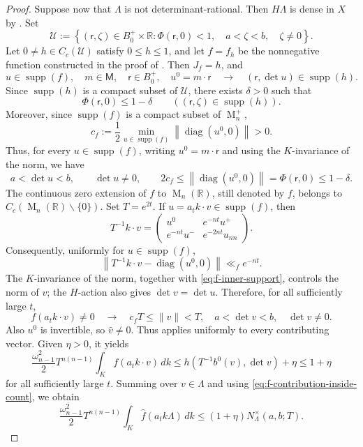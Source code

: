 \documentclass[reqno,11pt]{amsart}
\numberwithin{equation}{section}
\theoremstyle{definition}
\theoremstyle{remark}
\newcommand{\op}{\operatorname}
\newcommand{\M}{\op{M}}
\begin{document}
\begin{proof}
Suppose now that $\Lambda$ is not determinant-rational. Then
$H\Lambda$ is dense in $X$ by
. Set
$$
\mathcal U
:=
\left\{
(\mathsf r,\zeta)\in B_0^+\times\mathbb R:
\Phi(\mathsf r,0)<1,\quad
a<\zeta<b,\quad
\zeta\ne0
\right\}.
$$
Let $0\ne h\in C_c(\mathcal U)$ satisfy $0\le h\le1$, and let
$f=f_h$ be the nonnegative function constructed in the proof of
. Then $J_f=h$, and
\begin{equation}\label{eq:f-support-projection}
u\in\operatorname{supp}(f),\quad
m\in\mathsf M,\quad \mathsf r\in B_0^+,\quad
u^0=m\cdot\mathsf r
\quad\to\quad
(\mathsf r,\det u)\in\operatorname{supp}(h).
\end{equation}
Since $\operatorname{supp}(h)$ is a compact subset of $\mathcal U$,
there exists $\delta>0$ such that
$$
\Phi(\mathsf r,0)\le1-\delta
\qquad
((\mathsf r,\zeta)\in\operatorname{supp}(h)).
$$
Moreover, since $\operatorname{supp}(f)$ is a compact subset of
$\M_n^+$,
$$
c_f
:=
\frac12\min_{u\in\operatorname{supp}(f)}
\left\|\operatorname{diag}(u^0,0)\right\|>0.
$$
Thus, for every $u\in\operatorname{supp}(f)$, writing
$u^0=m\cdot\mathsf r$ and using the $K$-invariance of the norm, we have
\begin{equation}\label{eq:f-inner-support}
a<\det u<b,\qquad
\det u\ne0,\qquad
2c_f
\le
\left\|\operatorname{diag}(u^0,0)\right\|
=
\Phi(\mathsf r,0)
\le1-\delta.
\end{equation}
The continuous zero extension of $f$ to $\M_n(\mathbb R)$, still
denoted by $f$, belongs to
$C_c(\M_n(\mathbb R)\smallsetminus\{0\})$. Set $T=e^{2t}$. If $u=a_tk\cdot v\in\operatorname{supp}(f)$, then
$$
T^{-1}k\cdot v
=
\begin{pmatrix}
u^0&e^{-nt}u^+\\
e^{-nt}u^-&e^{-2nt}u_{nn}
\end{pmatrix}.
$$
Consequently, uniformly for $u\in\operatorname{supp}(f)$,
$$
\left\|
T^{-1}k\cdot v-\operatorname{diag}(u^0,0)
\right\|
\ll_f e^{-nt}.
$$
The $K$-invariance of the norm, together with
\eqref{eq:f-inner-support}, controls the
norm of $v$; the $H$-action also gives $\det v=\det u$. Therefore, for
all sufficiently large $t$,
\begin{equation}\label{eq:f-contribution-inside-count}
f(a_tk\cdot v)\ne0
\quad\to\quad
c_fT\le\|v\|<T,\quad
a<\det v<b,\quad
\det v\ne0.
\end{equation}
Also $u^0$ is invertible, so $\widehat v\ne0$. Thus  applies
uniformly to every contributing vector. Given $\eta>0$, it yields
$$
\frac{\omega_{n-1}^2}{2}T^{n(n-1)}
\int_Kf(a_tk\cdot v)\,dk
\le
h(T^{-1}b^0(v),\det v)+\eta
\le1+\eta
$$
for all sufficiently large $t$. Summing over $v\in\Lambda$ and using
\eqref{eq:f-contribution-inside-count}, we obtain
\begin{equation}\label{eq:count-dominates-K-average}
\frac{\omega_{n-1}^2}{2}T^{n(n-1)}
\int_K\widehat f(a_tk\Lambda)\,dk
\le
(1+\eta)N_\Lambda^\times(a,b;T).
\end{equation}


\end{proof}
\end{document}
